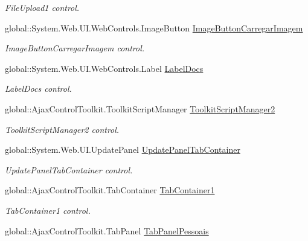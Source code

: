\begin{DoxyCompactItemize}
\begin{DoxyCompactList}\small\item\em FileUpload1 control. \item\end{DoxyCompactList}\item 
global::System.Web.UI.WebControls.ImageButton \hyperlink{class_sistema_r_h_1_1_alterar_colaborador_a82100735e224772af2ede53ad193b274}{ImageButtonCarregarImagem}
\begin{DoxyCompactList}\small\item\em ImageButtonCarregarImagem control. \item\end{DoxyCompactList}\item 
global::System.Web.UI.WebControls.Label \hyperlink{class_sistema_r_h_1_1_alterar_colaborador_a84fc2ee30cec6f8f5d177132ca2b6f15}{LabelDocs}
\begin{DoxyCompactList}\small\item\em LabelDocs control. \item\end{DoxyCompactList}\item 
global::AjaxControlToolkit.ToolkitScriptManager \hyperlink{class_sistema_r_h_1_1_alterar_colaborador_acbab47800fff56abc05ce1b83a1c9473}{ToolkitScriptManager2}
\begin{DoxyCompactList}\small\item\em ToolkitScriptManager2 control. \item\end{DoxyCompactList}\item 
global::System.Web.UI.UpdatePanel \hyperlink{class_sistema_r_h_1_1_alterar_colaborador_a494536807f39d7edd596cbf1fa42ac97}{UpdatePanelTabContainer}
\begin{DoxyCompactList}\small\item\em UpdatePanelTabContainer control. \item\end{DoxyCompactList}\item 
global::AjaxControlToolkit.TabContainer \hyperlink{class_sistema_r_h_1_1_alterar_colaborador_a1640c5524259d0cb5ac6faa904a86441}{TabContainer1}
\begin{DoxyCompactList}\small\item\em TabContainer1 control. \item\end{DoxyCompactList}\item 
global::AjaxControlToolkit.TabPanel \hyperlink{class_sistema_r_h_1_1_alterar_colaborador_aa49d17a04b906c6a8e4b777f5c8d4287}{TabPanelPessoais}

\end{DoxyCompactItemize}
